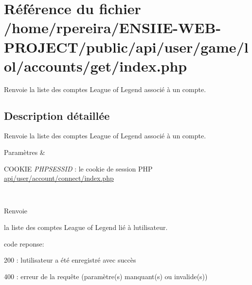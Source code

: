 \hypertarget{user_2game_2lol_2accounts_2get_2index_8php}{}\section{Référence du fichier /home/rpereira/\+E\+N\+S\+I\+I\+E-\/\+W\+E\+B-\/\+P\+R\+O\+J\+E\+C\+T/public/api/user/game/lol/accounts/get/index.php}
\label{user_2game_2lol_2accounts_2get_2index_8php}


Renvoie la liste des comptes League of Legend associé à un compte.  




\subsection{Description détaillée}
Renvoie la liste des comptes League of Legend associé à un compte. 


\begin{DoxyParams}{Paramètres}
{\em } & 
\begin{DoxyItemize}
\item C\+O\+O\+K\+IE {\itshape P\+H\+P\+S\+E\+S\+S\+ID} \+: le cookie de session P\+HP \hyperlink{user_2account_2connect_2index_8php}{api/user/account/connect/index.\+php} 
\end{DoxyItemize}\\
\hline
\end{DoxyParams}
\begin{DoxyReturn}{Renvoie}

\begin{DoxyItemize}
\item la liste des comptes League of Legend lié à l\textquotesingle{}utilisateur.
\item code reponse\+:
\begin{DoxyItemize}
\item 200 \+: l\textquotesingle{}utilisateur a été enregistré avec succès
\item 400 \+: erreur de la requête (paramètre(s) manquant(s) ou invalide(s)) 
\end{DoxyItemize}
\end{DoxyItemize}
\end{DoxyReturn}

